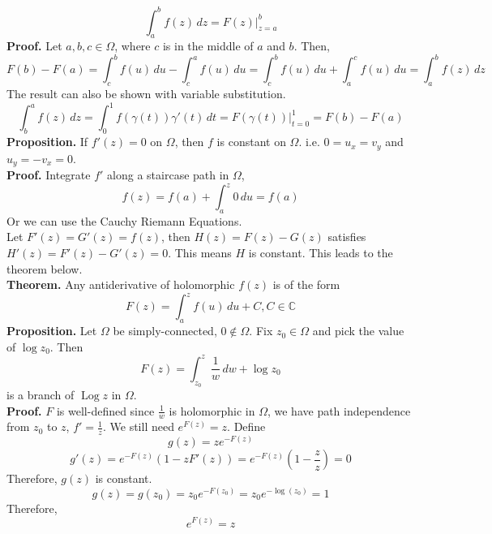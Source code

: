 \documentclass[11pt]{article}
\begin{document}
$$\int_a^b f(z) \,dz = F(z)\Big|_{z = a}^{b}$$
\textbf{Proof.} Let $a, b, c \in \Omega$, where $c$ is in the middle of $a$ and $b$. Then, \\
$$F(b) - F(a) = \int_c^b f(u) \,du - \int_c^a f(u) \,du = \int_c^b f(u) \,du + \int_a^c f(u) \,du = \int_a^b f(z) \,dz$$
The result can also be shown with variable substitution. 
$$ \int_b^a f(z) \,dz = \int_0^1 f(\gamma(t))\gamma'(t) \,dt = F(\gamma(t))\Big|_{t = 0}^{1} = F(b) - F(a)$$
\newline
\textbf{Proposition.} If $f'(z) = 0$ on $\Omega$, then $f$ is constant on $\Omega$. i.e. $0 = u_x = v_y$ and $u_y = -v_x = 0$. \\
\textbf{Proof.} Integrate $f'$ along a staircase path in $\Omega$, 
$$f(z) = f(a) + \int_a^z 0 \, du = f(a)$$
Or we can use the Cauchy Riemann Equations.\\
\newline
Let $F'(z) = G'(z) = f(z)$, then $H(z) = F(z) - G(z)$ satisfies $H'(z) = F'(z) - G'(z) = 0$. This means $H$ is constant. This leads to the theorem below.  \\
\newline
\textbf{Theorem.} Any antiderivative of holomorphic $f(z)$ is of the form 
$$F(z) = \int_a^z f(u) \, du + C, C \in \mathbb{C}$$ 
\newline
\textbf{Proposition.} Let $\Omega$ be simply-connected, $0 \notin \Omega$. Fix $z_0 \in \Omega$ and pick the value of $\operatorname{log}z_0$. Then 
$$F(z) = \int_{z_0}^z \frac{1}{w} \,dw + \operatorname{log} z_0$$
is a branch of $\operatorname{Log} z $ in $\Omega$.\\
\textbf{Proof.} $F$ is well-defined since $\frac{1}{w}$ is holomorphic in $\Omega$, we have path independence from $z_0$ to $z$, $f' = \frac{1}{z}$. 
We still need $e^{F(z)} = z$.
Define 
$$g(z) = ze^{-F(z)}$$
$$g'(z) = e^{-F(z)}(1 - zF'(z)) = e^{-F(z)}(1 - \frac{z}{z}) = 0$$
Therefore, $g(z)$ is constant. 
$$g(z) = g(z_0) = z_0e^{-F(z_0)} = z_0 e^{-\operatorname{log}(z_0)} = 1$$
Therefore, 
$$e^{F(z)} = z$$

\newpage
\end{document}
